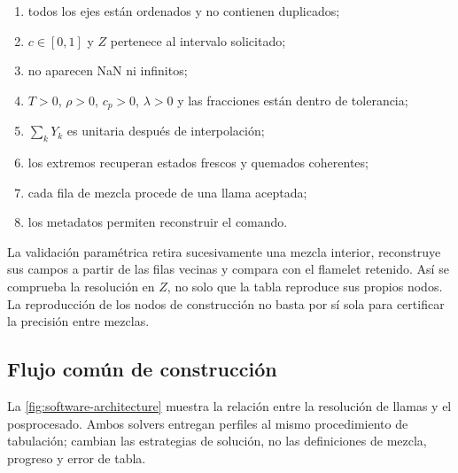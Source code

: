 \documentclass[12pt,a4paper,twoside,openany]{book}
\begin{document}
\begin{enumerate}
  \item todos los ejes están ordenados y no contienen duplicados;
  \item \(c\in[0,1]\) y \(Z\) pertenece al intervalo solicitado;
  \item no aparecen NaN ni infinitos;
  \item \(T>0\), \(\rho>0\), \(c_p>0\), \(\lambda>0\) y las fracciones están
        dentro de tolerancia;
  \item \(\sum_kY_k\) es unitaria después de interpolación;\par
  \item los extremos recuperan estados frescos y quemados coherentes;
  \item cada fila de mezcla procede de una llama aceptada;
  \item los metadatos permiten reconstruir el comando.
\end{enumerate}

La validación paramétrica retira sucesivamente una mezcla interior, reconstruye
sus campos a partir de las filas vecinas y compara con el flamelet retenido. Así
se comprueba la resolución en \(Z\), no solo que la tabla reproduce sus propios
nodos. La reproducción de los nodos de construcción no basta por sí sola para
certificar la precisión entre mezclas.

\subsection{Flujo común de construcción}

La \cref{fig:software-architecture} muestra la relación entre la resolución
de llamas y el posprocesado. Ambos solvers entregan perfiles al mismo
procedimiento de tabulación; cambian las estrategias de solución, no las
definiciones de mezcla, progreso y error de tabla.
\end{document}
